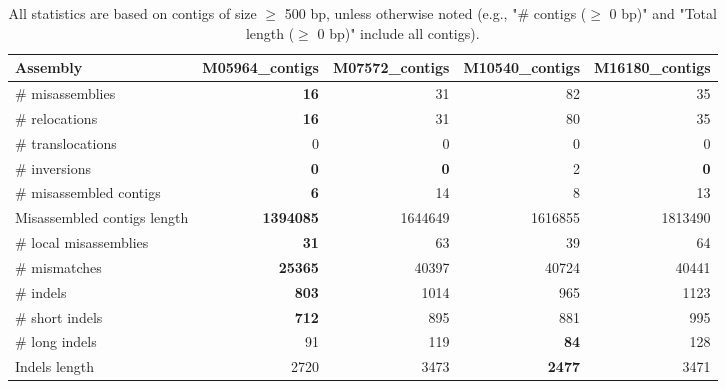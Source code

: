 \documentclass[12pt,a4paper]{article}
\begin{document}
\begin{table}[ht]
\begin{center}
\caption{All statistics are based on contigs of size $\geq$ 500 bp, unless otherwise noted (e.g., "\# contigs ($\geq$ 0 bp)" and "Total length ($\geq$ 0 bp)" include all contigs).}
\begin{tabular}{|l*{4}{|r}|}
\hline
Assembly & M05964\_contigs & M07572\_contigs & M10540\_contigs & M16180\_contigs \\ \hline
\# misassemblies & {\bf 16} & 31 & 82 & 35 \\ \hline
\hspace{5mm}\# relocations & {\bf 16} & 31 & 80 & 35 \\ \hline
\hspace{5mm}\# translocations & 0 & 0 & 0 & 0 \\ \hline
\hspace{5mm}\# inversions & {\bf 0} & {\bf 0} & 2 & {\bf 0} \\ \hline
\# misassembled contigs & {\bf 6} & 14 & 8 & 13 \\ \hline
Misassembled contigs length & {\bf 1394085} & 1644649 & 1616855 & 1813490 \\ \hline
\# local misassemblies & {\bf 31} & 63 & 39 & 64 \\ \hline
\# mismatches & {\bf 25365} & 40397 & 40724 & 40441 \\ \hline
\# indels & {\bf 803} & 1014 & 965 & 1123 \\ \hline
\hspace{5mm}\# short indels & {\bf 712} & 895 & 881 & 995 \\ \hline
\hspace{5mm}\# long indels & 91 & 119 & {\bf 84} & 128 \\ \hline
Indels length & 2720 & 3473 & {\bf 2477} & 3471 \\ \hline
\end{tabular}
\end{center}
\end{table}
\end{document}

